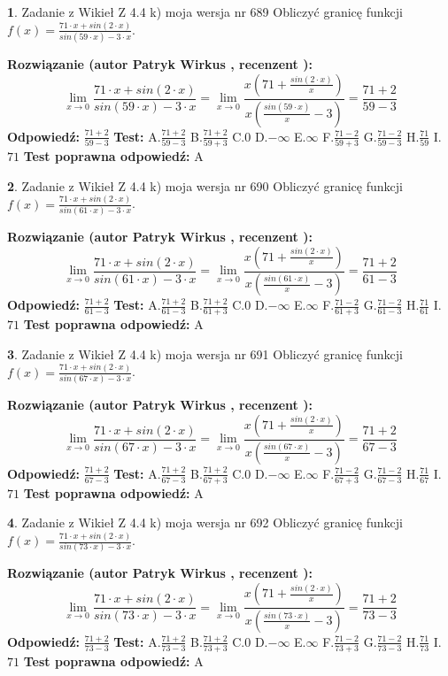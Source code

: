 \documentclass[12pt, a4paper]{article}
\theoremstyle{definition} %
\newtheorem{zad}{}
\newcommand{\zadStart}[1]{\begin{zad}#1\newline}
\newcommand{\zadStop}{\end{zad}}
\newcommand{\rozwStart}[2]{\noindent \textbf{Rozwiązanie (autor #1 , recenzent #2): }\newline}
\newcommand{\rozwStop}{\newline}
\newcommand{\odpStart}{\noindent \textbf{Odpowiedź:}\newline}
\newcommand{\odpStop}{\newline}
\newcommand{\testStart}{\noindent \textbf{Test:}\newline}
\newcommand{\testStop}{\newline}
\newcommand{\kluczStart}{\noindent \textbf{Test poprawna odpowiedź:}\newline}
\newcommand{\kluczStop}{\newline}
\begin{document}
\zadStart{Zadanie z Wikieł Z 4.4 k) moja wersja nr 689}
Obliczyć granicę funkcji $f(x)=\frac{71\cdot x +sin(2\cdot x)}{sin(59\cdot x) -3\cdot x}$.
\zadStop
\rozwStart{Patryk Wirkus}{}
$$\lim\limits_{x\to 0}\frac{71\cdot x +sin(2\cdot x)}{sin(59\cdot x) -3\cdot x}
=\lim\limits_{x\to 0}\frac{x(71+\frac{sin(2\cdot x)}{x})}{x(\frac{sin(59\cdot x)}{x}-3)}
=\frac{71+2}{59-3}$$
\rozwStop
\odpStart
$\frac{71+2}{59-3}$
\odpStop
\testStart
A.$\frac{71+2}{59-3}$
B.$\frac{71+2}{59+3}$
C.$0$
D.$-\infty$
E.$\infty$
F.$\frac{71-2}{59+3}$
G.$\frac{71-2}{59-3}$
H.$\frac{71}{59}$
I.$71$
\testStop
\kluczStart
A
\kluczStop



\zadStart{Zadanie z Wikieł Z 4.4 k) moja wersja nr 690}
Obliczyć granicę funkcji $f(x)=\frac{71\cdot x +sin(2\cdot x)}{sin(61\cdot x) -3\cdot x}$.
\zadStop
\rozwStart{Patryk Wirkus}{}
$$\lim\limits_{x\to 0}\frac{71\cdot x +sin(2\cdot x)}{sin(61\cdot x) -3\cdot x}
=\lim\limits_{x\to 0}\frac{x(71+\frac{sin(2\cdot x)}{x})}{x(\frac{sin(61\cdot x)}{x}-3)}
=\frac{71+2}{61-3}$$
\rozwStop
\odpStart
$\frac{71+2}{61-3}$
\odpStop
\testStart
A.$\frac{71+2}{61-3}$
B.$\frac{71+2}{61+3}$
C.$0$
D.$-\infty$
E.$\infty$
F.$\frac{71-2}{61+3}$
G.$\frac{71-2}{61-3}$
H.$\frac{71}{61}$
I.$71$
\testStop
\kluczStart
A
\kluczStop



\zadStart{Zadanie z Wikieł Z 4.4 k) moja wersja nr 691}
Obliczyć granicę funkcji $f(x)=\frac{71\cdot x +sin(2\cdot x)}{sin(67\cdot x) -3\cdot x}$.
\zadStop
\rozwStart{Patryk Wirkus}{}
$$\lim\limits_{x\to 0}\frac{71\cdot x +sin(2\cdot x)}{sin(67\cdot x) -3\cdot x}
=\lim\limits_{x\to 0}\frac{x(71+\frac{sin(2\cdot x)}{x})}{x(\frac{sin(67\cdot x)}{x}-3)}
=\frac{71+2}{67-3}$$
\rozwStop
\odpStart
$\frac{71+2}{67-3}$
\odpStop
\testStart
A.$\frac{71+2}{67-3}$
B.$\frac{71+2}{67+3}$
C.$0$
D.$-\infty$
E.$\infty$
F.$\frac{71-2}{67+3}$
G.$\frac{71-2}{67-3}$
H.$\frac{71}{67}$
I.$71$
\testStop
\kluczStart
A
\kluczStop



\zadStart{Zadanie z Wikieł Z 4.4 k) moja wersja nr 692}
Obliczyć granicę funkcji $f(x)=\frac{71\cdot x +sin(2\cdot x)}{sin(73\cdot x) -3\cdot x}$.
\zadStop
\rozwStart{Patryk Wirkus}{}
$$\lim\limits_{x\to 0}\frac{71\cdot x +sin(2\cdot x)}{sin(73\cdot x) -3\cdot x}
=\lim\limits_{x\to 0}\frac{x(71+\frac{sin(2\cdot x)}{x})}{x(\frac{sin(73\cdot x)}{x}-3)}
=\frac{71+2}{73-3}$$
\rozwStop
\odpStart
$\frac{71+2}{73-3}$
\odpStop
\testStart
A.$\frac{71+2}{73-3}$
B.$\frac{71+2}{73+3}$
C.$0$
D.$-\infty$
E.$\infty$
F.$\frac{71-2}{73+3}$
G.$\frac{71-2}{73-3}$
H.$\frac{71}{73}$
I.$71$
\testStop
\kluczStart
A
\kluczStop
\end{document}
